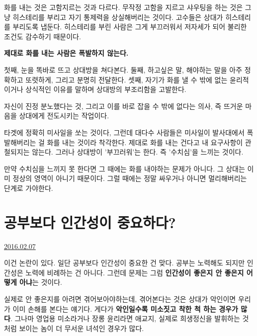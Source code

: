 화를 내는 것은 고함지르는 것과 다르다.
무작정 고함을 지르고 샤우팅을 하는 것은 그냥 히스테리를 부리고 자기 통제력을 상실해버리는 것이다.
고수들은 상대가 히스테리를 부리도록 냅둔다. 히스테리를 부린 사람은 그게 부끄러워서 저자세가 되어 불리한 조건도 감수하기 때문이다.
\vspace{5mm}

\textbf{제대로 화를 내는 사람은 폭발하지 않는다.}
\vspace{5mm}

첫째, 눈을 똑바로 뜨고 상대방을 쳐다본다.
둘째, 하고싶은 말, 해야하는 말을 아주 정확하고 또렷하게, 그리고 분명히 전달한다.
셋째, 자기가 화를 낼 수 밖에 없는 윤리적이거나 상식적인 이유를 말하며 상대방의 부조리함을 고발한다.
\vspace{5mm}

자신이 진정 분노했다는 것, 그리고 이를 바로 잡을 수 밖에 없다는 의사, 즉 뜨거운 마음을 상대에게 전도시키는 작업이다.
\vspace{5mm}

타겟에 정확히 미사일을 쏘는 것이다, 그런데 대다수 사람들은 미사일이 발사대에서 폭발해버리는 걸 화를 내는 것이라 착각한다.
제대로 화를 내는 건다고 내 요구사항이 관철되지는 않는다.
그러나 상대방이 '부끄러워'는 한다. 즉 '수치심'을 느끼는 것이다.
\vspace{5mm}

만약 수치심을 느끼지 못 한다면 그 때에는 화를 내야하는 문제가 아니다. 그 상대는 이미 정상의 영역이 아니기 때문이다.
그럴 때에는 정말 싸우거나 아니면 멀리해버리는 단계로 가야한다.
\vspace{5mm}









\section{공부보다 인간성이 중요하다?}
\href{https://www.kockoc.com/Apoc/626862}{2016.02.07}

\vspace{5mm}

이건 논란이 있다.
일단 공부보다 인간성이 중요한 건 맞다. 공부는 노력해도 되지만 인간성은 노력에 비례하는 건 아니다.
그런데 문제는 그럼 \textbf{인간성이 좋은지 안 좋은지 어떻게 아냐}는 것이다.
\vspace{5mm}

실제로 안 좋은지를 아려면 겪어보아야하는데, 겪어본다는 것은 상대가 악인이면 우리가 이미 손해를 본다는 얘기다.
게다가 \textbf{악인일수록 미소짓고 착한 척 하는 경우가 많다}.
그나마 영업용 미소라거나 장롱 윤리라면 애교지, 실제로 희생정신을 발휘하는 것처럼 보이는 놈이 더 무서운 녀석인 경우가 많다.
\vspace{5mm}

